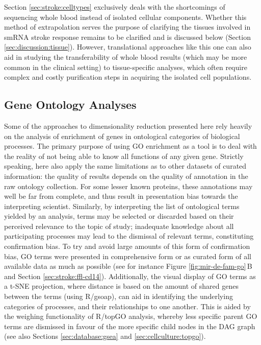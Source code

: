 Section \ref{sec:stroke:celltypes} exclusively deals with the shortcomings of sequencing whole blood instead of isolated cellular components. Whether this method of extrapolation serves the purpose of clarifying the tissues involved in smRNA stroke response remains to be clarified and is discussed below (Section \ref{sec:discussion:tissue}). However, translational approaches like this one can also aid in studying the transferability of whole blood results (which may be more common in the clinical setting) to tissue-specific analyses, which often require complex and costly purification steps in acquiring the isolated cell populations.

\subsection{Gene Ontology Analyses} \label{sec:discussion:go}
Some of the approaches to dimensionality reduction presented here rely heavily on the analysis of enrichment of genes in ontological categories of biological processes. The primary purpose of using GO enrichment as a tool is to deal with the reality of not being able to know all functions of any given gene. Strictly speaking, here also apply the same limitations as to other datasets of curated information: the quality of results depends on the quality of annotation in the raw ontology collection. For some lesser known proteins, these annotations may well be far from complete, and thus result in presentation bias towards the interpreting scientist. Similarly, by interpreting the list of ontological terms yielded by an analysis, terms may be selected or discarded based on their perceived relevance to the topic of study; inadequate knowledge about all participating processes may lead to the dismissal of relevant terms, constituting confirmation bias. To try and avoid large amounts of this form of confirmation bias, GO terms were presented in comprehensive form or as curated form of all available data as much as possible (see for instance Figure \ref{fig:mir-de-fam-go}\,B and Section \ref{sec:stroke:ffl-cd14}). Additionally, the visual display of GO terms as a t-SNE projection, where distance is based on the amount of shared genes between the terms (using R/gsoap\cite{Tokar2020}), can aid in identifying the underlying categories of processes, and their relationships to one another. This is aided by the weighing functionality of R/topGO analysis,\cite{Alexa2006} whereby less specific parent GO terms are dismissed in favour of the more specific child nodes in the DAG graph (see also Sections \ref{sec:database:gsea} and \ref{sec:cellculture:topgo}).


